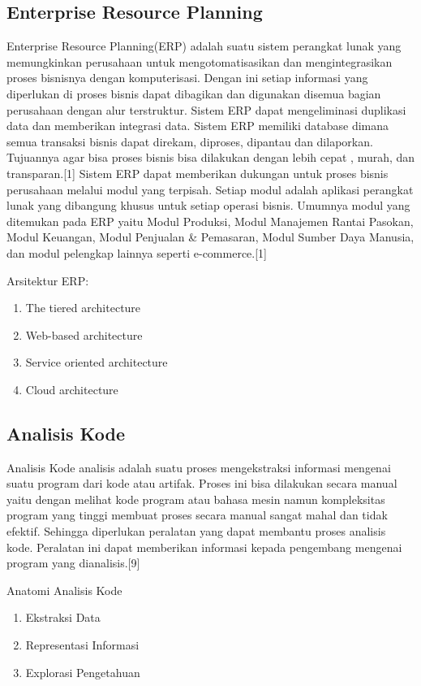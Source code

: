 \subsection{Enterprise Resource Planning}
Enterprise Resource Planning(ERP) adalah suatu sistem perangkat lunak yang memungkinkan perusahaan untuk mengotomatisasikan dan mengintegrasikan proses bisnisnya dengan komputerisasi. Dengan ini setiap informasi yang diperlukan di proses bisnis dapat dibagikan dan digunakan disemua bagian perusahaan dengan alur terstruktur. Sistem ERP dapat mengeliminasi duplikasi data dan memberikan integrasi data. Sistem ERP memiliki database dimana semua transaksi bisnis dapat direkam, diproses, dipantau dan dilaporkan. Tujuannya agar bisa proses bisnis bisa dilakukan dengan lebih cepat , murah, dan transparan.[1]
Sistem ERP dapat memberikan dukungan untuk proses bisnis perusahaan melalui modul yang terpisah. Setiap modul adalah aplikasi perangkat lunak yang dibangung khusus untuk setiap operasi bisnis. Umumnya modul yang ditemukan pada ERP yaitu Modul Produksi, Modul Manajemen Rantai Pasokan, Modul Keuangan, Modul Penjualan \& Pemasaran, Modul Sumber Daya Manusia, dan modul pelengkap lainnya seperti e-commerce.[1]

Arsitektur ERP: 
\begin{enumerate}[leftmargin=1.3cm]
	\item The tiered architecture
	\item Web-based architecture
	\item Service oriented architecture
	\item Cloud architecture
\end{enumerate}

\subsection{Analisis Kode}
Analisis Kode analisis adalah suatu proses mengekstraksi informasi mengenai suatu program dari kode atau artifak. Proses ini bisa dilakukan secara manual yaitu dengan melihat kode program atau bahasa mesin namun kompleksitas program yang tinggi membuat proses secara manual sangat mahal dan tidak efektif. Sehingga diperlukan peralatan yang dapat membantu proses analisis kode. Peralatan ini dapat memberikan informasi kepada pengembang mengenai program yang dianalisis.[9] 

Anatomi Analisis Kode
\begin{enumerate}[leftmargin=1.3cm]
	\item Ekstraksi Data
	\item Representasi Informasi
	\item Explorasi Pengetahuan
\end{enumerate}


